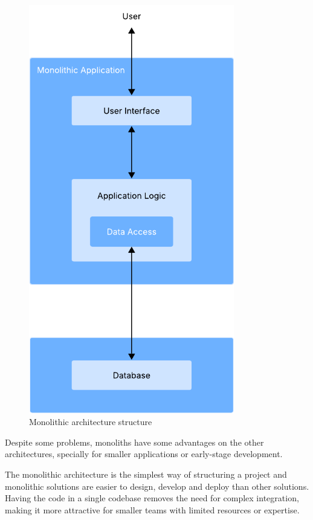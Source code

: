 \begin{figure}[htbp]
	\centering
	\includegraphics[width=0.8\textwidth, height=0.5\textheight, keepaspectratio]{Chapters/Figures/Architectures/Monolith.pdf}
	\caption{Monolithic architecture structure}
	\label{fig:architectures:monolithic}
\end{figure}

Despite some problems, monoliths have some advantages on the other architectures,
specially for smaller applications or early-stage development.

The monolithic architecture is the simplest way of structuring a
project and monolithic solutions are easier to design, develop and deploy
than other solutions.
Having the code in a single codebase removes the need for complex
integration, making it more attractive for smaller teams with limited
resources or expertise\cite{IBMMonolith}.


